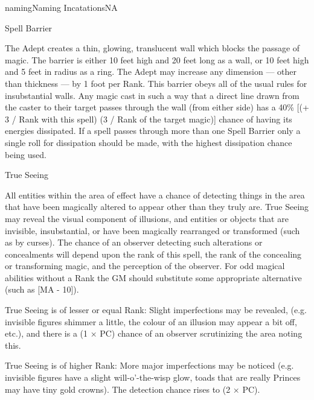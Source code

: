\begin{College}[2.0]{naming}{Naming Incatations}{NA}
\begin{spell}[S-9]{Spell Barrier}
\begin{effects}
The Adept creates a thin, glowing, translucent wall which blocks the
passage of magic.  The barrier is either 10 feet high and 20 feet long
as a wall, or 10 feet high and 5 feet in radius as a ring.  The Adept
may increase any dimension --- other than thickness --- by 1 foot per
Rank. This barrier obeys all of the usual rules for insubstantial
walls.  Any magic cast in such a way that a direct line drawn from the
caster to their target passes through the wall (from either side) has
a 40\% [(+ 3 / Rank with this spell) (3 / Rank of the target magic)]
chance of having its energies dissipated.  If a spell passes through
more than one Spell Barrier only a single roll for dissipation should
be made, with the highest dissipation chance being used.
\end{effects}
\end{spell}

\begin{spell}[S-10]{True Seeing}

\begin{effects}
All entities within the area of effect have a chance of detecting
things in the area that have been magically altered to appear other
than they truly are.  True Seeing may reveal the visual component of
illusions, and entities or objects that are invisible, insubstantial,
or have been magically rearranged or transformed (such as by
curses). The chance of an observer detecting such alterations or
concealments will depend upon the rank of this spell, the rank of the
concealing or transforming magic, and the perception of the
observer. For odd magical abilities without a Rank the GM should
substitute some appropriate alternative (such as [MA - 10]).

True Seeing is of lesser or equal Rank: Slight imperfections may be
revealed, (e.g. invisible figures shimmer a little, the colour of an
illusion may appear a bit off, etc.), and there is a (1 × PC) chance
of an observer scrutinizing the area noting this.

True Seeing is of higher Rank: More major imperfections may be noticed
(e.g. invisible figures have a slight will-o’-the-wisp glow, toads
that are really Princes may have tiny gold crowns).  The detection
chance rises to (2 × PC).


\end{effects}
\end{spell}
\end{College}
